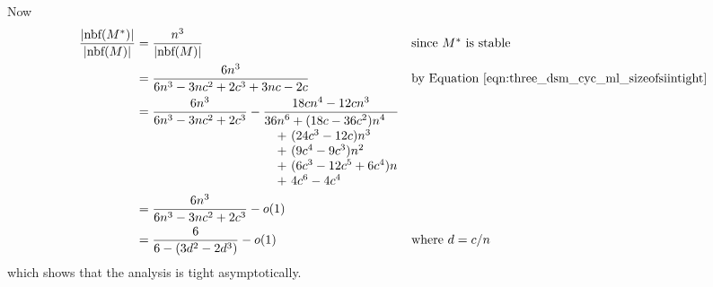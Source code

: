 Now
\begingroup
\allowdisplaybreaks
\begin{align*}
\frac{|\textrm{nbf}(M^*)|}{|\textrm{nbf}(M)|} &= \frac{n^3}{|\textrm{nbf}(M)|} && \mbox{since $M^*$ is stable}\\
    &= \frac{6n^3}{6n^3 - 3nc^2  + 2c^3 + 3nc - 2c} && \mbox{by Equation~\ref{eqn:three_dsm_cyc_ml_sizeofsiintight}}\\
    &= \frac{6n^3}{6n^3 - 3nc^2 + 2c^3} - \frac{18cn^4 - 12cn^3}{\begin{matrix*}[l]36n^6 + (18c - 36c^2)n^4\\\quad +\ (24c^3 - 12c)n^3\\\quad+\ (9c^4 - 9c^3)n^2\\\quad+\ (6c^3 - 12c^5 + 6c^4)n\\\quad+\ 4c^6 - 4c^4\end{matrix*}}\\
    &= \frac{6n^3}{6n^3 - 3nc^2 + 2c^3} - o(1)\\
    &= \frac{6}{6 - (3d^2 - 2d^3)} - o(1) && \mbox{where $d = c/n$}
\end{align*}
\endgroup
which shows that the analysis is tight asymptotically.

